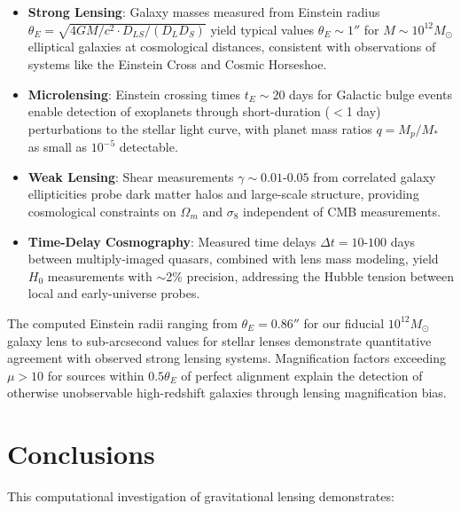\documentclass[11pt,a4paper]{article}
\begin{document}
\begin{itemize}
\item \textbf{Strong Lensing}: Galaxy masses measured from Einstein radius $\theta_E = \sqrt{4GM/c^2 \cdot D_{LS}/(D_L D_S)}$
yield typical values $\theta_E \sim 1''$ for $M \sim 10^{12} M_\odot$ elliptical galaxies at
cosmological distances, consistent with observations of systems like the Einstein Cross and
Cosmic Horseshoe.

\item \textbf{Microlensing}: Einstein crossing times $t_E \sim 20$ days for Galactic bulge events
enable detection of exoplanets through short-duration ($<$1 day) perturbations to the stellar
light curve, with planet mass ratios $q = M_p/M_*$ as small as $10^{-5}$ detectable.

\item \textbf{Weak Lensing}: Shear measurements $\gamma \sim 0.01$-$0.05$ from correlated galaxy
ellipticities probe dark matter halos and large-scale structure, providing cosmological constraints
on $\Omega_m$ and $\sigma_8$ independent of CMB measurements.

\item \textbf{Time-Delay Cosmography}: Measured time delays $\Delta t = 10$-$100$ days between
multiply-imaged quasars, combined with lens mass modeling, yield $H_0$ measurements with
$\sim$2\% precision, addressing the Hubble tension between local and early-universe probes.
\end{itemize}

The computed Einstein radii ranging from $\theta_E = 0.86''$ for our fiducial $10^{12} M_\odot$
galaxy lens to sub-arcsecond values for stellar lenses demonstrate quantitative agreement with
observed strong lensing systems. Magnification factors exceeding $\mu > 10$ for sources within
$0.5 \theta_E$ of perfect alignment explain the detection of otherwise unobservable high-redshift
galaxies through lensing magnification bias.

\section{Conclusions}

This computational investigation of gravitational lensing demonstrates:
\end{document}
